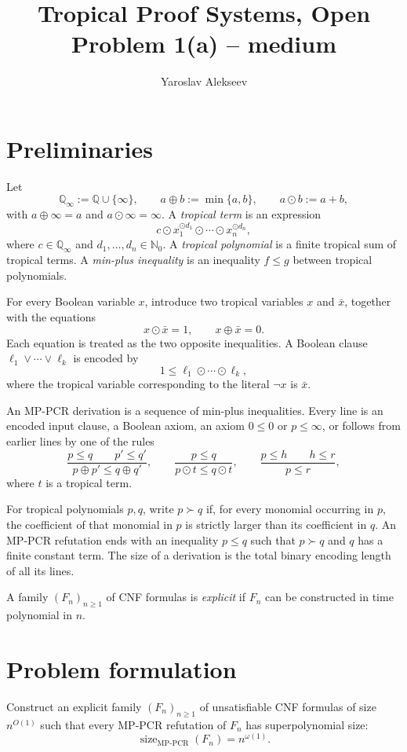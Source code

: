 \documentclass[10pt]{article}
\title{Tropical Proof Systems, Open Problem 1(a) -- medium}
\author{Yaroslav Alekseev}
\date{}
\newcommand{\Qinf}{\mathbb{Q}_{\infty}}
\newcommand{\MPPCR}{\mathrm{MP\text{-}PCR}}
\begin{document}
\maketitle

\section{Preliminaries}

Let
\[
\Qinf:=\mathbb{Q}\cup\{\infty\},
\qquad
 a\oplus b:=\min\{a,b\},
\qquad
 a\odot b:=a+b,
\]
with $a\oplus\infty=a$ and $a\odot\infty=\infty$.
A \emph{tropical term} is an expression
\[
 c\odot x_1^{\odot d_1}\odot\cdots\odot x_n^{\odot d_n},
\]
where $c\in\Qinf$ and $d_1,\ldots,d_n\in\mathbb{N}_0$.
A \emph{tropical polynomial} is a finite tropical sum of tropical terms.
A \emph{min-plus inequality} is an inequality $f\leq g$ between tropical
polynomials.

For every Boolean variable $x$, introduce two tropical variables $x$ and
$\bar x$, together with the equations
\[
 x\odot\bar x=1,
 \qquad
 x\oplus\bar x=0.
\]
Each equation is treated as the two opposite inequalities.  A Boolean clause
$\ell_1\vee\cdots\vee\ell_k$ is encoded by
\[
 1\leq \ell_1\odot\cdots\odot\ell_k,
\]
where the tropical variable corresponding to the literal $\neg x$ is $\bar x$.

An $\MPPCR$ derivation is a sequence of min-plus inequalities.  Every line is
an encoded input clause, a Boolean axiom, an axiom $0\leq0$ or $p\leq\infty$,
or follows from earlier lines by one of the rules
\[
\frac{p\leq q\qquad p'\leq q'}{p\oplus p'\leq q\oplus q'},
\qquad
\frac{p\leq q}{p\odot t\leq q\odot t},
\qquad
\frac{p\leq h\qquad h\leq r}{p\leq r},
\]
where $t$ is a tropical term.

For tropical polynomials $p,q$, write $p\succ q$ if, for every monomial
occurring in $p$, the coefficient of that monomial in $p$ is strictly larger
than its coefficient in $q$.  An $\MPPCR$ refutation ends with an inequality
$p\leq q$ such that $p\succ q$ and $q$ has a finite constant term.
The size of a derivation is the total binary encoding length of all its lines.

A family $(F_n)_{n\geq1}$ of CNF formulas is \emph{explicit} if $F_n$ can be
constructed in time polynomial in $n$.

\section{Problem formulation}

Construct an explicit family $(F_n)_{n\geq1}$ of unsatisfiable CNF formulas
of size $n^{O(1)}$ such that every $\MPPCR$ refutation of $F_n$ has
superpolynomial size:
\[
 \operatorname{size}_{\MPPCR}(F_n)=n^{\omega(1)}.
\]
\end{document}
